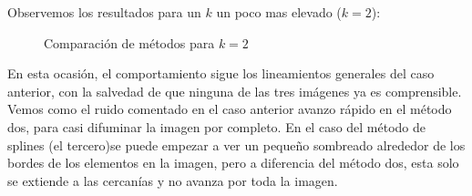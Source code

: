 Observemos los resultados para un $k$ un poco mas elevado ($k=2$):

\begin{figure}[H]
    \centering
    \qquad
    \qquad
    \caption{Comparación de métodos para $k = 2$}
    \label{fig:example}
\end{figure}

En esta ocasión, el comportamiento sigue los lineamientos generales del caso anterior, con la salvedad de que ninguna de las tres imágenes ya es comprensible. Vemos como el ruido comentado en el caso anterior avanzo rápido en el método dos, para casi difuminar la imagen por completo. En el caso del método de splines (el tercero)se puede empezar a ver un pequeño sombreado alrededor de los bordes de los elementos en la imagen, pero a diferencia del método dos, esta solo se extiende a las cercanías y no avanza por toda la imagen.


